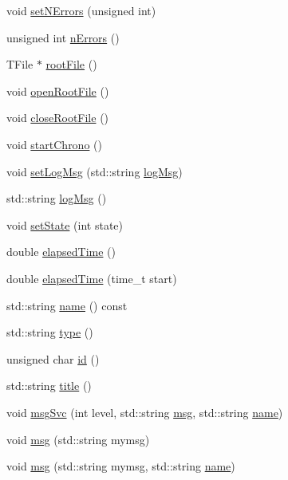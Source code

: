 \begin{DoxyCompactItemize}
void \hyperlink{classProcessus_a831b027b9cf18ab56fa6147b5d3055da}{set\+N\+Errors} (unsigned int)
\item 
unsigned int \hyperlink{classProcessus_a82a0487f82f07cc2c2dc2731f98149e7}{n\+Errors} ()
\item 
T\+File $\ast$ \hyperlink{classProcessus_a247e8c362ec08422cf53d08dd23b093c}{root\+File} ()
\item 
void \hyperlink{classProcessus_aacf6812880c1d1a2bf14a4a39458f443}{open\+Root\+File} ()
\item 
void \hyperlink{classProcessus_a2f3c41e99da4c738ea3d8f7b0d20a665}{close\+Root\+File} ()
\item 
void \hyperlink{classProcessus_a5e4d34b86241fa0756e07375a14ff4b2}{start\+Chrono} ()
\item 
void \hyperlink{classProcessus_a471833f89047aa9a7ff6200a31c17a1d}{set\+Log\+Msg} (std\+::string \hyperlink{classProcessus_a42fdeb17dc13ba854222666b6aa29b61}{log\+Msg})
\item 
std\+::string \hyperlink{classProcessus_a42fdeb17dc13ba854222666b6aa29b61}{log\+Msg} ()
\item 
void \hyperlink{classProcessus_ad38cde0f1bcefa00b068e7947b8af927}{set\+State} (int state)
\item 
double \hyperlink{classProcessus_aecca96218c65bc805c988cd95447df55}{elapsed\+Time} ()
\item 
double \hyperlink{classProcessus_a06d3815ad56593dfd0d3c1f534f8b146}{elapsed\+Time} (time\+\_\+t start)
\item 
std\+::string \hyperlink{classObject_a300f4c05dd468c7bb8b3c968868443c1}{name} () const
\item 
std\+::string \hyperlink{classObject_a84f99f70f144a83e1582d1d0f84e4e62}{type} ()
\item 
unsigned char \hyperlink{classObject_af99145335cc61ff6e2798ea17db009d2}{id} ()
\item 
std\+::string \hyperlink{classObject_a73a0f1a41828fdd8303dd662446fb6c3}{title} ()
\item 
void \hyperlink{classObject_a3f9d5537ebce0c0f2bf6ae4d92426f3c}{msg\+Svc} (int level, std\+::string \hyperlink{classObject_a58b2d0618c2d08cf2383012611528d97}{msg}, std\+::string \hyperlink{classObject_a300f4c05dd468c7bb8b3c968868443c1}{name})
\item 
void \hyperlink{classObject_a58b2d0618c2d08cf2383012611528d97}{msg} (std\+::string mymsg)
\item 
void \hyperlink{classObject_ac5d59299273cee27aacf7de00d2e7034}{msg} (std\+::string mymsg, std\+::string \hyperlink{classObject_a300f4c05dd468c7bb8b3c968868443c1}{name})

\end{DoxyCompactItemize}
